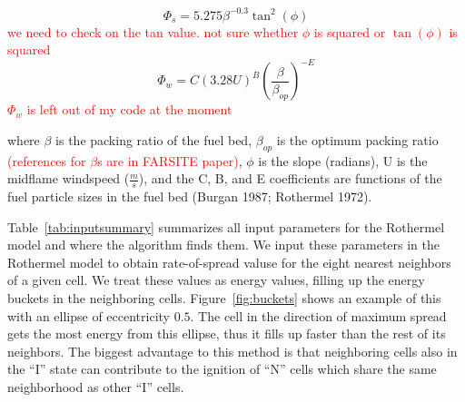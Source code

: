 \documentclass{article}
\newcommand{\note}[1]{\textcolor{red}{#1}}
\begin{document}
\begin{equation}
\Phi_s = 5.275\beta^{-0.3}\tan^2(\phi)
\end{equation}
\note{we need to check on the tan value. not sure whether $\phi$ is squared or $\tan(\phi)$ is squared}
\begin{equation}
\Phi_w = C(3.28U)^B\left(\frac{\beta}{\beta_{op}}\right)^{-E}
\end{equation}
\note{$\Phi_w$ is left out of my code at the moment}

where $\beta$ is the packing ratio of the fuel bed, $\beta_{op}$ is the optimum packing ratio \note{(references for $\beta$s are in FARSITE paper)}, $\phi$ is the slope (radians), U is the midflame windspeed ($\frac{m}{s}$), and the C, B, and E coefficients are functions of the fuel particle sizes in the fuel bed \cite{}(Burgan 1987; Rothermel 1972).

Table~\ref{tab:inputsummary} summarizes all input parameters for the Rothermel model and where the algorithm finds them. We input these parameters in the Rothermel model to obtain rate-of-spread valuse for the eight nearest neighbors of a given cell. We treat these values as energy values, filling up the energy buckets in the neighboring cells. Figure~\ref{fig:buckets} shows an example of this with an ellipse of eccentricity $0.5$. The cell in the direction of maximum spread gets the most energy from this ellipse, thus it fills up faster than the rest of its neighbors. The biggest advantage to this method is that neighboring cells also in the ``I'' state can contribute to the ignition of ``N'' cells which share the same neighborhood as other ``I'' cells. 
\end{document}
